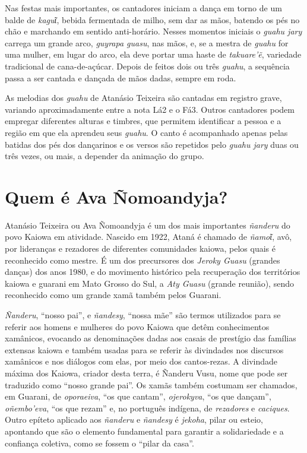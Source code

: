 Nas festas mais importantes, os cantadores iniciam a dança em torno de
um balde de \emph{kaguῖ}, bebida fermentada de milho, sem dar as mãos,
batendo os pés no chão e marchando em sentido anti-horário. Nesses
momentos iniciais o \emph{guahu jary} carrega um grande arco,
\emph{guyrapa guasu}, nas mãos, e, se a mestra de \emph{guahu} for uma
mulher, em lugar do arco, ela deve portar uma haste de \emph{takuare'ẽ},
variedade tradicional de cana-de-açúcar. Depois de feitos dois ou três
\emph{guahu}, a sequência passa a ser cantada e dançada de mãos dadas,
sempre em roda.

As melodias dos \emph{guahu} de Atanásio Teixeira são cantadas em
registro grave, variando aproximadamente entre a nota Lá2 e o Fá3.
Outros cantadores podem empregar diferentes alturas e timbres, que
permitem identificar a pessoa e a região em que ela aprendeu seus
\emph{guahu}. O canto é acompanhado apenas pelas batidas dos pés dos
dançarinos e os versos são repetidos pelo \emph{guahu jary} duas ou três
vezes, ou mais, a depender da animação do grupo.

\section{Quem é Ava Ñomoandyja?}

Atanásio Teixeira ou Ava Ñomoandyja é um dos mais importantes
\emph{ñanderu} do povo Kaiowa em atividade. Nascido em 1922, Ataná é
chamado de \emph{ñamoῖ}, avô, por lideranças e rezadores de diferentes
comunidades kaiowa, pelos quais é reconhecido como mestre. É um dos
precursores dos \emph{Jeroky Guasu} (grandes danças) dos anos 1980, e do
movimento histórico pela recuperação dos territórios kaiowa e guarani em
Mato Grosso do Sul, a \emph{Aty Guasu} (grande reunião), sendo
reconhecido como um grande xamã também pelos Guarani.

\emph{Ñanderu}, ``nosso pai'', e \emph{ñandesy}, ``nossa mãe'' são
termos utilizados para se referir aos homens e mulheres do povo Kaiowa
que detêm conhecimentos xamânicos, evocando as denominações dadas aos
casais de prestígio das famílias extensas kaiowa e também usadas para se
referir às divindades nos discursos xamânicos e nos diálogos com elas,
por meio dos cantos-rezas. A divindade máxima dos Kaiowa, criador desta
terra, é Ñanderu Vusu, nome que pode ser traduzido como ``nosso grande
pai''. Os xamãs também costumam ser chamados, em Guarani, de
\emph{oporaeiva}, ``os que cantam'', \emph{ojerokyva}, ``os que
dançam'', \emph{oñembo'eva}, ``os que rezam'' e, no português indígena,
de \emph{rezadores} e \emph{caciques}. Outro epíteto aplicado aos
\emph{ñanderu} e \emph{ñandesy} é \emph{jekoha}, pilar ou esteio,
apontando que são o elemento fundamental para garantir a solidariedade e
a confiança coletiva, como se fossem o ``pilar da casa''.

